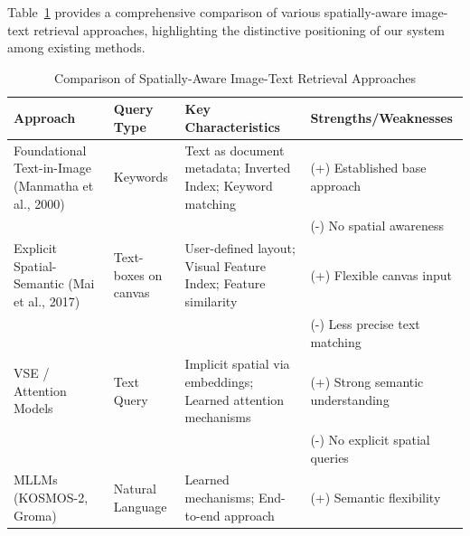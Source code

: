 \documentclass[manuscript,screen]{acmart}
\begin{document}
Table~\ref{tab:approaches} provides a comprehensive comparison of various spatially-aware image-text retrieval approaches, highlighting the distinctive positioning of our system among existing methods.

\begin{table}
    \caption{Comparison of Spatially-Aware Image-Text Retrieval Approaches}
    \label{tab:approaches}
    \begin{tabular}{p{2.8cm}p{2.8cm}p{4.5cm}p{3.4cm}}
        \toprule
        Approach                                           & Query Type                & Key Characteristics                                                                & Strengths/Weaknesses                 \\
        \midrule
        Foundational Text-in-Image (Manmatha et al., 2000) & Keywords                  & Text as document metadata; Inverted Index; Keyword matching                        & (+) Established base approach        \\
                                                           &                           &                                                                                    & (-) No spatial awareness             \\
        \midrule
        Explicit Spatial-Semantic (Mai et al., 2017)       & Text-boxes on canvas      & User-defined layout; Visual Feature Index; Feature similarity                      & (+) Flexible canvas input            \\
                                                           &                           &                                                                                    & (-) Less precise text matching       \\
        \midrule
        VSE / Attention Models                             & Text Query                & Implicit spatial via embeddings; Learned attention mechanisms \cite{Faghri18VSEpp} & (+) Strong semantic understanding    \\
                                                           &                           &                                                                                    & (-) No explicit spatial queries      \\
        \midrule
        MLLMs (KOSMOS-2, Groma)                            & Natural Language          & Learned mechanisms; End-to-end approach                                            & (+) Semantic flexibility             \\

\end{tabular}
\end{table}
\end{document}
